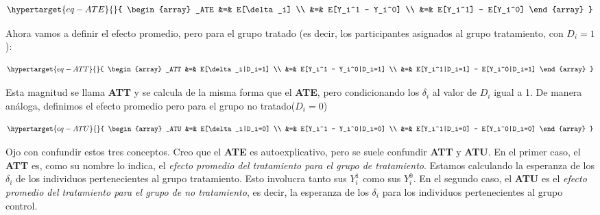 \documentclass[
  letterpaper,
  DIV=11,
  numbers=noendperiod,
  oneside]{scrreprt}
\begin{document}
\begin{equation}\protect\hypertarget{eq-ATE}{}{
\begin{array}
_ATE &=& E[\delta_i] \\
&=& E[Y_i^1 - Y_i^0] \\
&=& E[Y_i^1] - E[Y_i^0] 
\end{array}
}\label{eq-ATE}\end{equation}

Ahora vamos a definir el efecto promedio, pero para el grupo tratado (es
decir, los participantes asignados al grupo tratamiento, con \(D_i=1\)):

\begin{equation}\protect\hypertarget{eq-ATT}{}{
\begin{array}
_ATT &=& E[\delta_i|D_i=1] \\
&=& E[Y_i^1 - Y_i^0|D_i=1] \\
&=& E[Y_i^1|D_i=1] - E[Y_i^0|D_i=1] 
\end{array}
}\label{eq-ATT}\end{equation}

Esta magnitud se llama \textbf{ATT} y se calcula de la misma forma que
el \textbf{ATE}, pero condicionando los \(\delta_i\) al valor de \(D_i\)
igual a 1. De manera análoga, definimos el efecto promedio pero para el
grupo no tratado(\(D_i=0\))

\begin{equation}\protect\hypertarget{eq-ATU}{}{
\begin{array}
_ATU &=& E[\delta_i|D_i=0] \\
&=& E[Y_i^1 - Y_i^0|D_i=0] \\
&=& E[Y_i^1|D_i=0] - E[Y_i^0|D_i=0] 
\end{array}
}\label{eq-ATU}\end{equation}

Ojo con confundir estos tres conceptos. Creo que el \textbf{ATE} es
autoexplicativo, pero se suele confundir \textbf{ATT} y \textbf{ATU}. En
el primer caso, el \textbf{ATT} es, como su nombre lo indica, el
\emph{efecto promedio del tratamiento para el grupo de tratamiento}.
Estamos calculando la esperanza de los \(\delta_i\) de los individuos
pertenecientes al grupo tratamiento. Esto involucra tanto sus \(Y^1_i\)
como sus \(Y^0_i\). En el segundo caso, el \textbf{ATU} es el
\emph{efecto promedio del tratamiento para el grupo de no tratamiento},
es decir, la esperanza de los \(\delta_i\) para los individuos
pertenecientes al grupo control.
\end{document}
